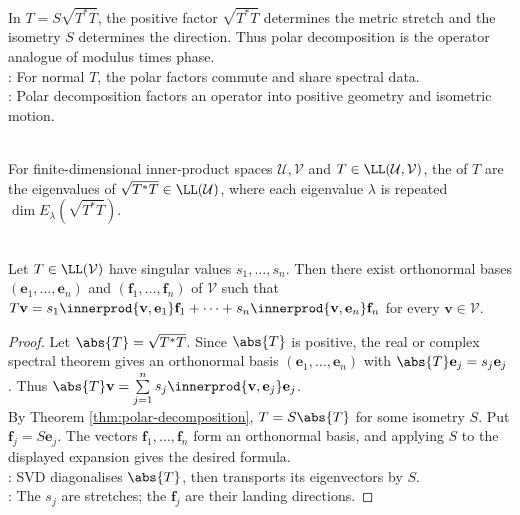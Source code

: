 \begin{perspective} \label{per:polar-decomposition-spectral-analogy} \\
In $T=S\sqrt{T^*T}$, the positive factor $\sqrt{T^*T}$ determines the metric stretch and the isometry $S$ determines the direction. Thus polar decomposition is the operator analogue of modulus times phase.\\
: For normal $T$, the polar factors commute and share spectral data.\\
: Polar decomposition factors an operator into positive geometry and isometric motion.
\end{perspective}

\begin{definition} \label{def:singular-values} \\
For finite-dimensional inner-product spaces $\mathcal{U},\mathcal{V}$ and $T\in\LL(\mathcal{U},\mathcal{V})$, the  of $T$ are the eigenvalues of $\sqrt{T^*T}\in\LL(\mathcal{U})$, where each eigenvalue $\lambda$ is repeated $\dim E_{\lambda}(\sqrt{T^*T})$.
\end{definition}

\begin{theorem} \label{thm:singular-value-decomposition} \\
Let $T\in\LL(\mathcal{V})$ have singular values $s_1,\ldots,s_n$. Then there exist orthonormal bases $(\mathbf{e}_1,\ldots,\mathbf{e}_n)$ and $(\mathbf{f}_1,\ldots,\mathbf{f}_n)$ of $\mathcal{V}$ such that $T\mathbf{v}=s_1\innerprod{\mathbf{v},\mathbf{e}_1}\mathbf{f}_1+\cdots+s_n\innerprod{\mathbf{v},\mathbf{e}_n}\mathbf{f}_n$ for every $\mathbf{v}\in\mathcal{V}$.
\begin{proof}
Let $\abs{T}=\sqrt{T^*T}$. Since $\abs{T}$ is positive, the real or complex spectral theorem gives an orthonormal basis $(\mathbf{e}_1,\ldots,\mathbf{e}_n)$ with $\abs{T}\mathbf{e}_j=s_j\mathbf{e}_j$. Thus $\abs{T}\mathbf{v}=\sum\limits_{j=1}^{n}s_j\innerprod{\mathbf{v},\mathbf{e}_j}\mathbf{e}_j$.\\
By Theorem \ref{thm:polar-decomposition}, $T=S\abs{T}$ for some isometry $S$. Put $\mathbf{f}_j=S\mathbf{e}_j$. The vectors $\mathbf{f}_1,\ldots,\mathbf{f}_n$ form an orthonormal basis, and applying $S$ to the displayed expansion gives the desired formula.\\
: SVD diagonalises $\abs{T}$, then transports its eigenvectors by $S$.\\
: The $s_j$ are stretches; the $\mathbf{f}_j$ are their landing directions.
\end{proof}
\end{theorem}

